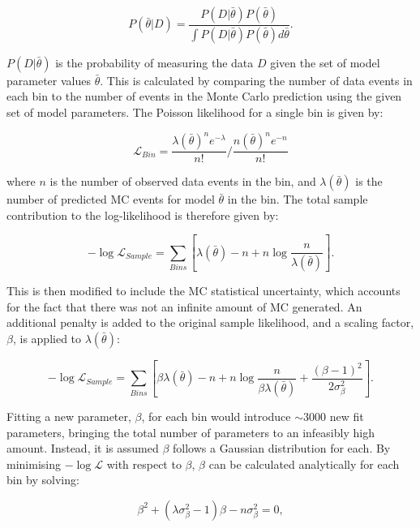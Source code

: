 \begin{equation}
P(\bar{\theta}|D) = \frac{P(D|\bar{\theta}) P(\bar{\theta})}{\int P(D|\bar{\theta}) P(\bar{\theta}) d\bar{\theta}}.
\label{eqn:bayes}
\end{equation}

$P(D|\bar{\theta})$ is the probability of measuring the data $D$ given the set of model parameter values $\bar{\theta}$. This is calculated by comparing the number of data events in each bin to the number of events in the Monte Carlo prediction using the given set of model parameters. The Poisson likelihood for a single bin is given by:

\begin{equation}
\mathcal{L}_{Bin} = \frac{\lambda(\bar{\theta}) ^n e^{-\lambda}}{n!} / \frac{n(\bar{\theta}) ^n e^{-n}}{n!}
\end{equation}

where $n$ is the number of observed data events in the bin, and $\lambda(\bar{\theta})$ is the number of predicted MC events for model $\bar{\theta}$ in the bin. The total sample contribution to the log-likelihood is therefore given by:

\begin{equation}
-\log\mathcal{L}_{Sample} = \sum_{Bins}[\lambda(\bar{\theta}) - n + n \log \frac{n}{\lambda(\bar{\theta})}].
\label{eqn:llhsample}
\end{equation}

This is then modified to include the MC statistical uncertainty, which accounts for the fact that there was not an infinite amount of MC generated. An additional penalty is added to the original sample likelihood, and a scaling factor, $\beta$, is applied to $\lambda(\bar{\theta})$:

\begin{equation}
-\log\mathcal{L}_{Sample} = \sum_{Bins}[\beta\lambda(\bar{\theta}) - n + n \log \frac{n}{\beta\lambda(\bar{\theta})} + \frac{(\beta -1)^2}{2\sigma^{2}_\beta}].
\label{eqn:llhbb}
\end{equation}

Fitting a new parameter, $\beta$, for each bin would introduce $\sim$3000 new fit parameters, bringing the total number of parameters to an infeasibly high amount. Instead, it is assumed $\beta$ follows a Gaussian distribution for each. By minimising $-\log\mathcal{L}$ with respect to $\beta$, $\beta$ can be calculated analytically for each bin by solving:

\begin{equation}
\beta^2 + (\lambda \sigma^{2}_{\beta} - 1)\beta - n \sigma^{2}_{\beta} = 0,
\label{eqn:bbquad}
\end{equation}

